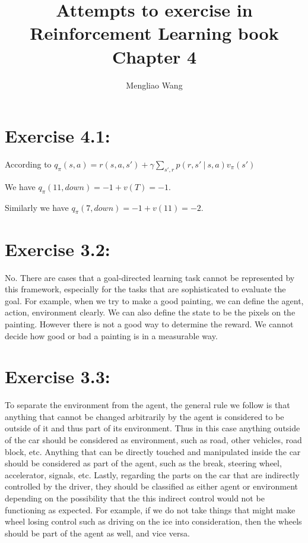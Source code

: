 \documentclass[10pt,letterpaper]{article}
\title{Attempts to exercise in Reinforcement Learning book Chapter 4}
\author{Mengliao Wang}
\newcommand\given[1][]{\:#1\vert\:}
\begin{document}
\maketitle



\section*{Exercise 4.1: }
\label{4.1}

According to $q_\pi(s,a) = r(s,a,s') + \gamma\sum_{s',r}p(r,s'\given s,a)v_\pi(s')$

We have $q_\pi(11,down) = -1 + v(T) = -1$.

Similarly we have $q_\pi(7, down) = -1 + v(11) = -2$.


\section*{Exercise 3.2: }
\label{3.2}

No. There are cases that a goal-directed learning task cannot be represented by this framework, especially for the tasks that are sophisticated to evaluate the goal. For example, when we try to make a good painting, we can define the agent, action, environment clearly. We can also define the state to be the pixels on the painting. However there is not a good way to determine the reward. We cannot decide how good or bad a painting is in a measurable way. 

\section*{Exercise 3.3: }
\label{3.3}

To separate the environment from the agent, the general rule we follow is that anything that cannot be changed arbitrarily by the agent is considered to be outside of it and thus part of its environment. Thus in this case anything outside of the car should be considered as environment, such as road, other vehicles, road block, etc. Anything that can be directly touched and manipulated inside the car should be considered as part of the agent, such as the break, steering wheel, accelerator, signals, etc. Lastly, regarding the parts on the car that are indirectly controlled by the driver, they should be classified as either agent or environment depending on the possibility that the this indirect control would not be functioning as expected. For example, if we do not take things that might make wheel losing control such as driving on the ice into consideration, then the wheels should be part of the agent as well, and vice versa.
\end{document}
